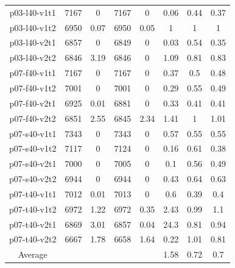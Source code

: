 \begin{table}[!h]
\begin {tabular}[h]{|c|c|c|c|c|c|c|c|}
p03-l40-v1t1 &  7167    & 0 & 7167  & 0 & 0.06  & 0.44  & 0.37  \\
p03-l40-v1t2 &  6950    & 0.07  & 6950  & 0.05  & 1 & 1 & 1 \\
p03-l40-v2t1 &  6857    & 0 & 6849  & 0 & 0.03  & 0.54  & 0.35  \\
p03-l40-v2t2 &  6846    & 3.19  & 6846  & 0 & 1.09  & 0.81  & 0.83  \\\hline
p07-f40-v1t1 &  7167    & 0 & 7167  & 0 & 0.37  & 0.5   & 0.48  \\
p07-f40-v1t2 &  7001    & 0 & 7001  & 0 & 0.29  & 0.55  & 0.49  \\
p07-f40-v2t1 &  6925    & 0.01  & 6881  & 0 & 0.33  & 0.41  & 0.41  \\
p07-f40-v2t2 &  6851    & 2.55  & 6845  & 2.34  & 1.41  & 1 & 1.01  \\\hline
p07-s40-v1t1 &  7343    & 0 & 7343  & 0 & 0.57  & 0.55  & 0.55  \\
p07-s40-v1t2 &  7117    & 0 & 7124  & 0 & 0.16  & 0.61  & 0.38  \\
p07-s40-v2t1 &  7000    & 0 & 7005  & 0 & 0.1   & 0.56  & 0.49  \\
p07-s40-v2t2 &  6944    & 0 & 6944  & 0 & 0.43  & 0.64  & 0.63  \\\hline
p07-t40-v1t1 &  7012    & 0.01  & 7013  & 0 & 0.6   & 0.39  & 0.4   \\
p07-t40-v1t2 &  6972    & 1.22  & 6972  & 0.35  & 2.43  & 0.99  & 1.1   \\
p07-t40-v2t1 &  6869    & 3.01  & 6857  & 0.04  & 24.3  & 0.81  & 0.94  \\
p07-t40-v2t2 &  6667    & 1.78  & 6658  & 1.64  & 0.22  & 1.01  & 0.81  \\\hline
Average      & \mbox{}  & \mbox{} & \mbox{} & \mbox{} & 1.58 &  0.72 &  0.7 \\\hline
\end{tabular}
\end{table}

